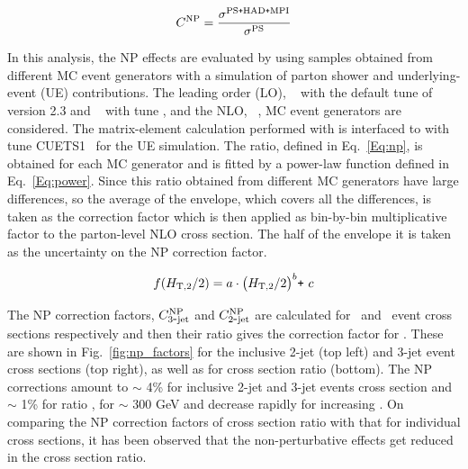 \begin{equation}
  \label{Eq:np}
  C^{\rm NP} = \frac{\sigma^{\rm PS \plusn HAD \plusn MPI}}{\sigma^{\rm PS}}
\end{equation}

In this analysis, the NP effects are evaluated by using samples obtained from different MC event generators with a simulation of parton shower and underlying-event (UE) contributions. The leading order (LO), \HERWIGPP~\cite{Bahr:2008pv} with the default tune of version 2.3 and \PYTHIAS~\cite{Sjostrand:2006za} with tune \Ztwostar, and the NLO, \POWHEG~\cite{Nason:2004rx,Frixione:2007vw,Alioli:2010xa}, MC event generators are considered. The matrix-element calculation performed with \POWHEG is interfaced to \PYTHIAE with tune CUETS1~\cite{Khachatryan:2015pea} for the UE simulation. The ratio, defined in Eq.~\ref{Eq:np}, is obtained for each MC generator and is fitted by a power-law function defined in Eq.~\ref{Eq:power}. Since this ratio obtained from different MC generators have large differences, so the average of the envelope, which covers all the differences, is taken as the correction factor which is then applied as bin-by-bin multiplicative factor to the parton-level NLO cross section. The half of the envelope it is taken as the uncertainty on the NP correction factor. 

\begin{equation}
  \label{Eq:power}
  f(H_{\mathrm{T,2}}/2) = a\cdot\big(H_{\mathrm{T,2}}/2\big)^{b}\texttt{+}~c
\end{equation}

The NP correction factors, $C_{\rm 3\mbox{-} jet}^{\rm NP}$ and $C_{\rm 2\mbox{-} jet}^{\rm NP}$ are calculated for \njt~and \njth~event cross sections respectively and then their ratio gives the correction factor for \ratio . These are shown in Fig.~\ref{fig:np_factors} for the inclusive 2-jet (top left) and 3-jet event cross sections (top right), as well as for cross section ratio \ratio (bottom). The NP corrections amount to $\sim$ 4\% for inclusive 2-jet and 3-jet events cross section and $\sim$ 1\% for ratio \ratio, for \httwo $\sim$ 300 GeV and decrease rapidly for increasing \httwo. On comparing the NP correction factors of cross section ratio with that for individual cross sections, it has been observed that the non-perturbative effects get reduced in the cross section ratio.


